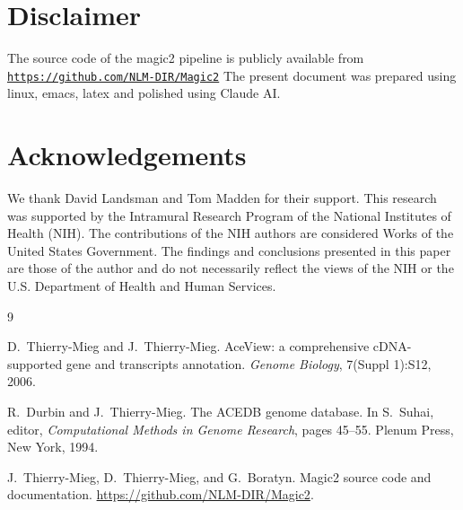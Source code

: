 \documentclass[11pt]{article}
\begin{document}
\section*{Disclaimer}

The source code of the magic2 pipeline
is publicly available from \href{https://github.com/NLM-DIR/Magic2}{\texttt{https://github.com/NLM-DIR/Magic2}}
The present document was prepared using linux, emacs, latex
and polished using Claude AI.

\section*{Acknowledgements}

We thank David Landsman and Tom Madden for their support.
This research was supported by the Intramural Research Program of the National Institutes of Health (NIH). The contributions of the NIH authors are considered Works of the United States Government. The findings and conclusions presented in this paper are those of the author and do not necessarily reflect the views of the NIH or the U.S. Department of Health and Human Services.

\begin{thebibliography}{9}

D.~Thierry-Mieg and J.~Thierry-Mieg.
AceView: a comprehensive cDNA-supported gene and transcripts annotation.
\emph{Genome Biology}, 7(Suppl 1):S12, 2006.

R.~Durbin and J.~Thierry-Mieg.
The ACEDB genome database.
In S.~Suhai, editor, \emph{Computational Methods in Genome Research},
pages 45--55. Plenum Press, New York, 1994.

J.~Thierry-Mieg, D.~Thierry-Mieg, and G.~Boratyn.
Magic2 source code and documentation.
\url{https://github.com/NLM-DIR/Magic2}.

\end{thebibliography}
\end{document}
